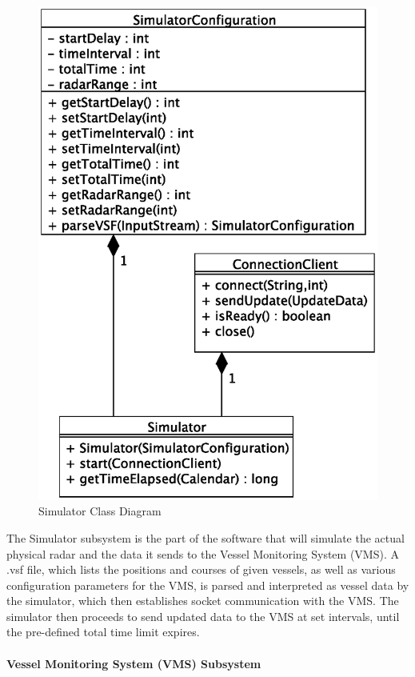 \documentclass{article}
\begin{document}
\begin{figure}[!htb]
\caption{Simulator Class Diagram}
\centering
\includegraphics[scale=0.7]{diagrams/simulator-class-diagram.eps}
\end{figure}
The Simulator subsystem is the part of the software that will simulate the actual physical radar and the data it sends to the Vessel Monitoring System (VMS). A .vsf file, which lists the positions and courses of given vessels, as well as various configuration parameters for the VMS, is parsed and interpreted as vessel data by the simulator, which then establishes socket communication with the VMS. The simulator then proceeds to send updated data to the VMS at set intervals, until the pre-defined total time limit expires.

\break
\paragraph{Vessel Monitoring System (VMS) Subsystem}
\end{document}
